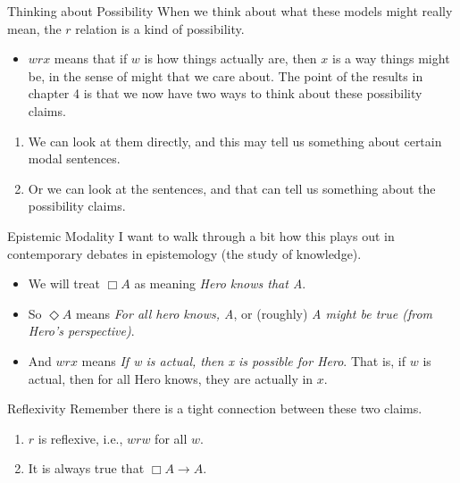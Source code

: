\documentclass[
  14pt,
  letterpaper,
  ignorenonframetext,
]{beamer}
\providecommand{\tightlist}{%
  \setlength{\itemsep}{0pt}\setlength{\parskip}{0pt}}\usepackage{longtable,booktabs,array}
\begin{document}
\begin{frame}{Thinking about Possibility}
\protect\hypertarget{thinking-about-possibility}{}
When we think about what these models might really mean, the \(r\)
relation is a kind of possibility.

\begin{itemize}
\tightlist
\item
  \(wrx\) means that if \(w\) is how things actually are, then \(x\) is
  a way things might be, in the sense of might that we care about.
  \pause  The point of the results in chapter 4 is that we now have two
  ways to think about these possibility claims.
\end{itemize}

\begin{enumerate}
\tightlist
\item
  We can look at them directly, and this may tell us something about
  certain modal sentences.
\item
  Or we can look at the sentences, and that can tell us something about
  the possibility claims.
\end{enumerate}
\end{frame}

\begin{frame}{Epistemic Modality}
\protect\hypertarget{epistemic-modality}{}
I want to walk through a bit how this plays out in contemporary debates
in epistemology (the study of knowledge).

\begin{itemize}
\tightlist
\item
  We will treat \(\Box A\) as meaning \emph{Hero knows that A}.
\item
  So \(\Diamond A\) means \emph{For all hero knows, A}, or (roughly)
  \emph{A might be true (from Hero's perspective)}.
\item
  And \(wrx\) means \emph{If w is actual, then x is possible for Hero}.
  That is, if \(w\) is actual, then for all Hero knows, they are
  actually in \(x\).
\end{itemize}
\end{frame}

\begin{frame}{Reflexivity}
\protect\hypertarget{reflexivity}{}
Remember there is a tight connection between these two claims.

\begin{enumerate}
\tightlist
\item
  \(r\) is reflexive, i.e., \(wrw\) for all \(w\).
\item
  It is always true that \(\Box A \rightarrow A\).
\end{enumerate}
\end{frame}
\end{document}
